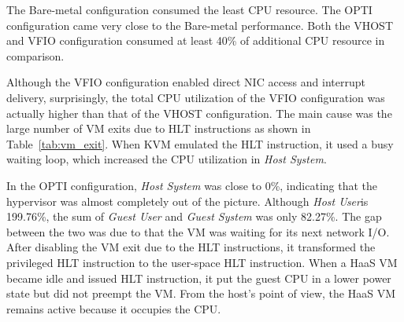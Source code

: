 The Bare-metal configuration consumed the least CPU resource.
The OPTI configuration came very close to the Bare-metal
performance. Both the VHOST and VFIO configuration consumed at
least 40\% of additional CPU resource in comparison.

Although the VFIO configuration enabled direct NIC access and
interrupt delivery, surprisingly, the total CPU utilization of
the VFIO configuration was actually higher than that of the
VHOST configuration. The main cause was the large number of VM
exits due to HLT instructions as shown in
Table~\ref{tab:vm_exit}. When KVM emulated the HLT
instruction, it used a busy waiting loop, which
increased the CPU utilization in \emph{Host System}.

In the OPTI configuration, \emph{Host System} was close to
0\%, indicating that the hypervisor was almost completely out
of the picture. Although \emph{Host User}is 199.76\%, the sum
of \emph{Guest User} and \emph{Guest System} was only 82.27\%.
The gap between the two was due to that the VM was waiting for
its next network I/O. After disabling the VM exit due to the
HLT instructions, it transformed the privileged HLT
instruction to the user-space HLT instruction. When a HaaS VM
became idle and issued HLT instruction, it put the guest CPU
in a lower power state but did not preempt the VM. From the
host's point of view, the HaaS VM remains active because it
occupies the CPU.


